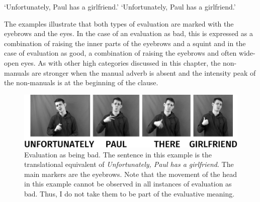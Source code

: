 \begin{exe}
\ex\label{ex:unfortgirlfried}\begin{xlist}
\ex {}
%
\glt `Unfortunately, Paul has a girlfriend.' \label{ex:unfortgirlfrieda}
\ex {}
\glt `Unfortunately, Paul has a girlfriend.' \label{ex:unfortgirlfriedb}


\end{xlist}
\end{exe}

\noindent The examples illustrate that both types of evaluation are marked with the eyebrows and the eyes. In the case of an evaluation as bad, this is expressed as a combination of raising the inner parts of the eyebrows and a squint and in the case of evaluation as good, a combination of raising the eyebrows and often wide-open eyes.  As with other high categories discussed in this chapter, the non-manuals are stronger when the manual adverb is absent and the intensity peak of the non-manuals is at the beginning of the clause. 

\begin{figure}[bt]
\centering
	\includegraphics[width=1.0\textwidth]{evalbadsw.jpg}
	\caption{Evaluation as being bad. The sentence in this example is the translational equivalent of \textit{Unfortunately, Paul has a girlfriend}. The main markers are the eyebrows. Note that the movement of the head in this example cannot be observed in all instances of evaluation as bad. Thus, I do not take them to be part of the evaluative meaning.}
	\label{fig:evalbad}
\end{figure}

